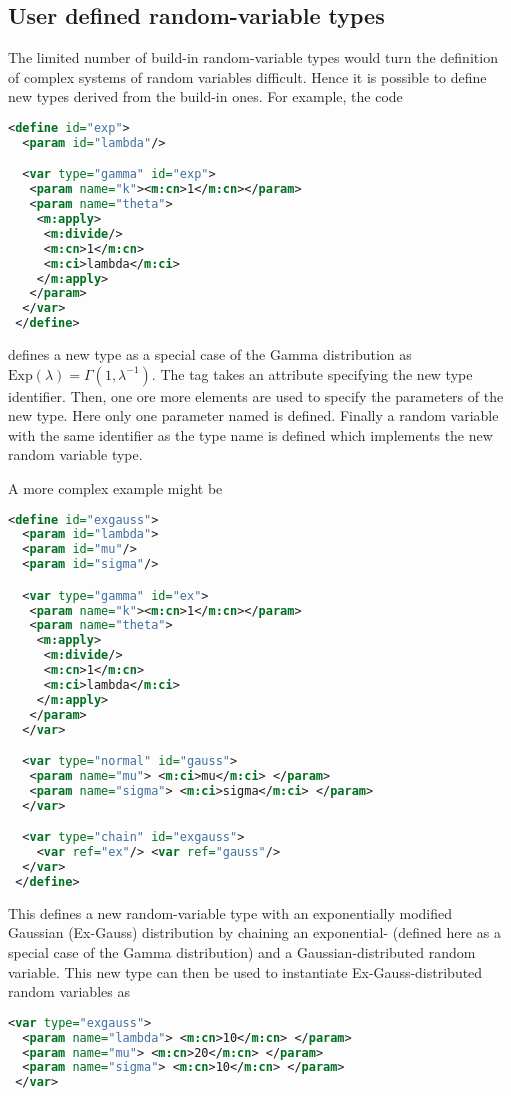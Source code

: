 \subsection{User defined random-variable types}
The limited number of build-in random-variable types would turn the definition of complex systems of random
variables difficult. Hence it is possible to define new types derived from the build-in ones. For example,
the code 
\begin{lstlisting}[language=XML]
 <define id="exp">
  <param id="lambda"/>

  <var type="gamma" id="exp">
   <param name="k"><m:cn>1</m:cn></param>
   <param name="theta">
    <m:apply>
     <m:divide/>
     <m:cn>1</m:cn>
     <m:ci>lambda</m:ci>
    </m:apply>
   </param>
  </var>
 </define>
\end{lstlisting}
defines a new type  as a special case of the Gamma distribution as
$\text{Exp}(\lambda) = \Gamma(1,\lambda^{-1})$. The  tag takes an  
attribute specifying the new type identifier. Then, one ore more  elements are
used to specify the parameters of the new type. 
Here only one parameter named  is defined. Finally a random variable with the same
identifier as the type name is defined which implements the new random variable type.

A more complex example might be
\begin{lstlisting}[language=XML]
 <define id="exgauss">
  <param id="lambda">
  <param id="mu"/>
  <param id="sigma"/>

  <var type="gamma" id="ex">
   <param name="k"><m:cn>1</m:cn></param>
   <param name="theta">
    <m:apply>
     <m:divide/>
     <m:cn>1</m:cn>
     <m:ci>lambda</m:ci>
    </m:apply>
   </param>
  </var>

  <var type="normal" id="gauss">
   <param name="mu"> <m:ci>mu</m:ci> </param>
   <param name="sigma"> <m:ci>sigma</m:ci> </param>
  </var>

  <var type="chain" id="exgauss">
    <var ref="ex"/> <var ref="gauss"/>
  </var>
 </define>
\end{lstlisting}

This defines a new random-variable type with an exponentially modified Gaussian (Ex-Gauss) 
distribution by chaining an exponential- (defined here as a special case of the Gamma 
distribution) and a Gaussian-distributed random variable. This new type can then be used
to instantiate Ex-Gauss-distributed random variables as
\begin{lstlisting}[language=XML]
 <var type="exgauss">
  <param name="lambda"> <m:cn>10</m:cn> </param>
  <param name="mu"> <m:cn>20</m:cn> </param>
  <param name="sigma"> <m:cn>10</m:cn> </param>
 </var>
\end{lstlisting}

